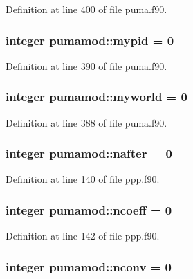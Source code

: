 \-Definition at line 400 of file puma.\-f90.

\hypertarget{classpumamod_abe37e4023fe000a8d7a8f39be8dd8354}{
\subsubsection[{mypid}]{\setlength{\rightskip}{0pt plus 5cm}integer {\bf pumamod\-::mypid} = 0}}
\label{classpumamod_abe37e4023fe000a8d7a8f39be8dd8354}


\-Definition at line 390 of file puma.\-f90.

\hypertarget{classpumamod_af617e09ab068329347fe45e390e46923}{
\subsubsection[{myworld}]{\setlength{\rightskip}{0pt plus 5cm}integer {\bf pumamod\-::myworld} = 0}}
\label{classpumamod_af617e09ab068329347fe45e390e46923}


\-Definition at line 388 of file puma.\-f90.

\hypertarget{classpumamod_a865b5e1934a6f612b35bade36c2d15bd}{
\subsubsection[{nafter}]{\setlength{\rightskip}{0pt plus 5cm}integer {\bf pumamod\-::nafter} = 0}}
\label{classpumamod_a865b5e1934a6f612b35bade36c2d15bd}


\-Definition at line 140 of file ppp.\-f90.

\hypertarget{classpumamod_ab5156c8a13ca4542d36017a32cb2e276}{
\subsubsection[{ncoeff}]{\setlength{\rightskip}{0pt plus 5cm}integer {\bf pumamod\-::ncoeff} = 0}}
\label{classpumamod_ab5156c8a13ca4542d36017a32cb2e276}


\-Definition at line 142 of file ppp.\-f90.

\hypertarget{classpumamod_a4ad70fab2e818be277ec41afde36c5d2}{
\subsubsection[{nconv}]{\setlength{\rightskip}{0pt plus 5cm}integer {\bf pumamod\-::nconv} = 0}}
\label{classpumamod_a4ad70fab2e818be277ec41afde36c5d2}



